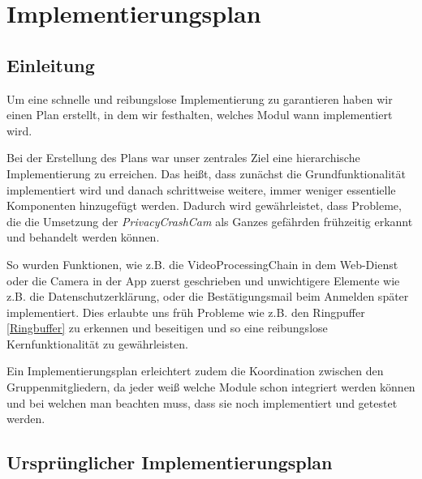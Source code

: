 \chapter{Implementierungsplan} \label{chap:Implementierungsplan}

\section{Einleitung}
Um eine schnelle und reibungslose Implementierung zu garantieren haben wir einen Plan erstellt, in dem wir festhalten, welches Modul wann implementiert wird.\par
Bei der Erstellung des Plans war unser zentrales Ziel eine hierarchische Implementierung zu erreichen. Das heißt, dass zunächst die Grundfunktionalität implementiert wird und danach schrittweise weitere, immer weniger essentielle Komponenten hinzugefügt werden. Dadurch wird gewährleistet, dass Probleme, die die Umsetzung der \textit{PrivacyCrashCam} als Ganzes gefährden frühzeitig erkannt und behandelt werden können.\par
So wurden Funktionen, wie z.B. die VideoProcessingChain in dem Web-Dienst oder die Camera in der App zuerst geschrieben und unwichtigere Elemente wie z.B. die Datenschutzerklärung, oder die Bestätigungsmail beim Anmelden später implementiert. Dies erlaubte uns früh Probleme wie z.B. den Ringpuffer \eqref{Ringbuffer} zu erkennen und beseitigen und so eine reibungslose Kernfunktionalität zu gewährleisten. \par
Ein Implementierungsplan erleichtert zudem die Koordination zwischen den Gruppenmitgliedern, da jeder weiß welche Module schon integriert werden können und bei welchen man beachten muss, dass sie noch implementiert und getestet werden.

\newpage

\section{Ursprünglicher Implementierungsplan}

